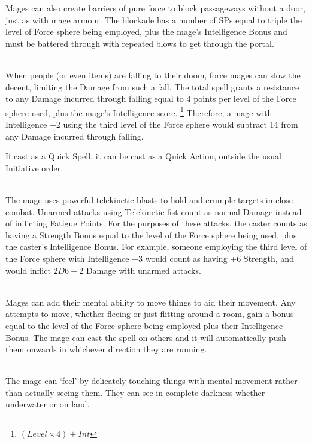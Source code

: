 \begin{multicols}{2}
Mages can also create barriers of pure force to block passageways without a door, just as with mage armour.
The blockade has a number of \glspl{SP} equal to triple the level of Force sphere being employed, plus the mage's Intelligence Bonus and must be battered through with repeated blows to get through the portal.

\\
When people (or even items) are falling to their doom, force mages can slow the decent, limiting the Damage from such a fall.
The total spell grants a resistance to any Damage incurred through falling equal to 4 points per level of the Force sphere used, plus the mage's Intelligence score.%
\footnote{$(Level \times 4) + Int$}
Therefore, a mage with Intelligence +2 using the third level of the Force sphere would subtract 14 from any Damage incurred through falling.

If cast as a Quick Spell, it can be cast as a Quick Action, outside the usual Initiative order.

\\
The mage uses powerful telekinetic blasts to hold and crumple targets in close combat.
Unarmed attacks using Telekinetic fist count as normal Damage instead of inflicting Fatigue Points.
For the purposes of these attacks, the caster counts as having a Strength Bonus equal to the level of the Force sphere being used, plus the caster's Intelligence Bonus.
For example, someone employing the third level of the Force sphere with Intelligence +3 would count as having +6 Strength, and would inflict $2D6+2$ Damage with unarmed attacks.

\\
Mages can add their mental ability to move things to aid their movement.
Any attempts to move, whether fleeing or just flitting around a room, gain a bonus equal to the level of the Force sphere being employed plus their Intelligence Bonus.
The mage can cast the spell on others and it will automatically push them onwards in whichever direction they are running.

\spelllevel

\\
The mage can `feel' by delicately touching things with mental movement rather than actually seeing them. They can see in complete darkness whether underwater or on land.


\end{multicols}
